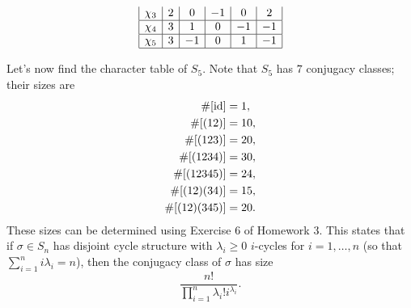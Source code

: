 \begin{exmp}{}
\begin{align*}
\begin{array}{|c|c|c|c|c|c|}
            \chi_3 & 2                  & 0                   & -1                   & 0                     & 2                       \\ \hline
            \chi_4 & 3                  & 1                   & 0                    & -1                    & -1                      \\ \hline
            \chi_5 & 3                  & -1                  & 0                    & 1                     & -1                      \\ \hline
        \end{array} 
    \end{align*}
\end{exmp}

\begin{exmp}{}
    Let's now find the character table of $S_5$. Note that $S_5$ has $7$ 
    conjugacy classes; their sizes are 
    \begin{align*}
        \#[\operatorname{id}] &= 1, \\ 
        \#[(12)] &= 10, \\ 
        \#[(123)] &= 20, \\ 
        \#[(1234)] &= 30, \\ 
        \#[(12345)] &= 24, \\ 
        \#[(12)(34)] &= 15, \\ 
        \#[(12)(345)] &= 20. 
    \end{align*}
    These sizes can be determined using Exercise 6 of Homework 3. This states that 
    if $\sigma \in S_n$ has disjoint cycle structure with $\lambda_i \geq 0$ 
    $i$-cycles for $i = 1, \dots, n$ (so that $\sum_{i=1}^n i\lambda_i = n$), 
    then the conjugacy class of $\sigma$ has size 
    \[ \frac{n!}{\prod_{i=1}^n \lambda_i! i^{\lambda_i}}. \] 


\end{exmp}

